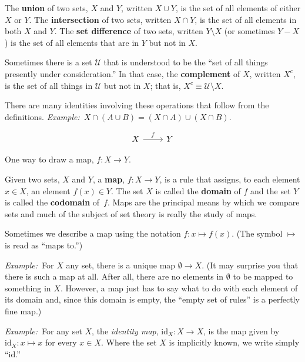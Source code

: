 \documentclass[12pt, a4paper]{article}
\newcommand{\defn}[1]{\textbf{#1}}
\newcommand{\eg}{\emph{Example:}\relax}
\newcommand{\id}{\text{id}}
\begin{document}
The \defn{union} of two sets, $X$ and $Y$, written $X \cup Y$, is the set
of all elements of either $X$ or $Y$. The \defn{intersection} of two
sets, written $X \cap Y$, is the set of all elements in both $X$ and
$Y$. The \defn{set difference} of two sets, written $Y \setminus X$ (or
sometimes $Y-X$) is the set of all elements that are in $Y$ but not in
$X$.

Sometimes there is a set $\mathcal{U}$ that is understood to be the “set of all
things presently under consideration.” In that case, the
\defn{complement} of $X$, written $X^c$, is the set of all things in
$\mathcal{U}$ but not in $X$; that is, $X^c \equiv \mathcal{U} \setminus X$.

There are many identities involving these operations that follow from
the definitions.
\eg\ $X\cap(A\cup B) = (X\cap A) \cup (X\cap B)$.

\begin{sidefigure}
  \[\begin{tikzcd}
    X \arrow[r, "f"] & Y
  \end{tikzcd}\]
  \caption{One way to draw a map, $f\colon X\to Y$.}
\end{sidefigure}
Given two sets, $X$ and $Y$, a \defn{map}, $f\colon X \to Y$, is a rule
that assigns, to each element $x \in X$, an element $f(x) \in Y$. The set
$X$ is called the \defn{domain} of $f$ and the set $Y$ is called the
\defn{codomain} of~$f$. Maps are the principal means by which we compare
sets and much of the subject of set theory is really the study of
maps.

Sometimes we describe a map using the notation $f\colon x\mapsto f(x)$. (The
symbol $\mapsto$ is read as ``maps to.'')

\eg\ For $X$ any set, there is a unique map $\emptyset \to X$. (It may surprise
you that there is such a map at all. After all, there are no elements
in $\emptyset$ to be mapped to something in $X$. However, a map just has to
say what to do with each element of its domain and, since this domain
is empty, the “empty set of rules” is a perfectly fine map.)

\eg\ For any set $X$, the \emph{identity map}, $\id_X\colon X \to X$, is
the map given by $\id_X\colon x \mapsto x$ for every $x\in X$. Where the set
$X$ is implicitly known, we write simply “$\id$.”
\end{document}
